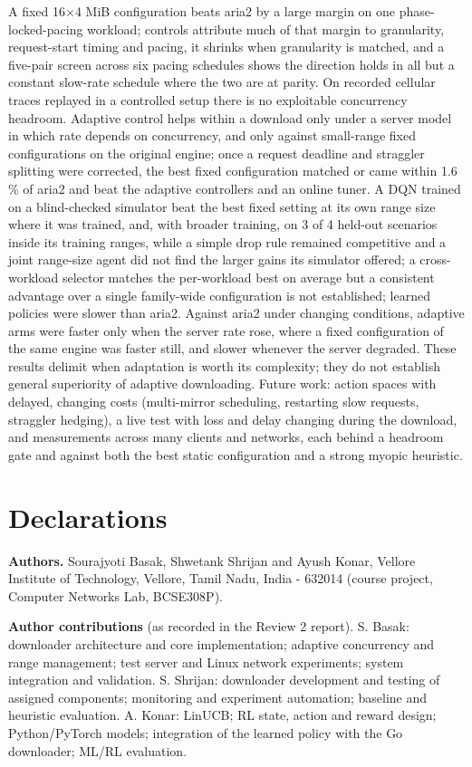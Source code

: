 \documentclass{ieeeaccess}
\begin{document}
A fixed 16×4 MiB configuration beats aria2 by a large margin on one phase-locked-pacing workload; controls attribute much of that margin to granularity, request-start timing and pacing, it shrinks when granularity is matched, and a five-pair screen across six pacing schedules shows the direction holds in all but a constant slow-rate schedule where the two are at parity. On recorded cellular traces replayed in a controlled setup there is no exploitable concurrency headroom. Adaptive control helps within a download only under a server model in which rate depends on concurrency, and only against small-range fixed configurations on the original engine; once a request deadline and straggler splitting were corrected, the best fixed configuration matched or came within 1.6 \% of aria2 and beat the adaptive controllers and an online tuner. A DQN trained on a blind-checked simulator beat the best fixed setting at its own range size where it was trained, and, with broader training, on 3 of 4 held-out scenarios inside its training ranges, while a simple drop rule remained competitive and a joint range-size agent did not find the larger gains its simulator offered; a cross-workload selector matches the per-workload best on average but a consistent advantage over a single family-wide configuration is not established; learned policies were slower than aria2. Against aria2 under changing conditions, adaptive arms were faster only when the server rate rose, where a fixed configuration of the same engine was faster still, and slower whenever the server degraded. These results delimit when adaptation is worth its complexity; they do not establish general superiority of adaptive downloading. Future work: action spaces with delayed, changing costs (multi-mirror scheduling, restarting slow requests, straggler hedging), a live test with loss and delay changing during the download, and measurements across many clients and networks, each behind a headroom gate and against both the best static configuration and a strong myopic heuristic.


\section*{Declarations}

\textbf{Authors.} Sourajyoti Basak, Shwetank Shrijan and Ayush Konar, Vellore Institute of Technology, Vellore, Tamil Nadu, India - 632014 (course project, Computer Networks Lab, BCSE308P).


\textbf{Author contributions} (as recorded in the Review 2 report). S. Basak: downloader architecture and core implementation; adaptive concurrency and range management; test server and Linux network experiments; system integration and validation. S. Shrijan: downloader development and testing of assigned components; monitoring and experiment automation; baseline and heuristic evaluation. A. Konar: LinUCB; RL state, action and reward design; Python/PyTorch models; integration of the learned policy with the Go downloader; ML/RL evaluation.
\end{document}
